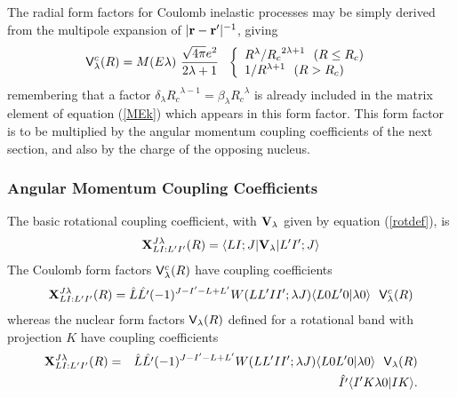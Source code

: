 \documentclass[11pt,a4paper]{article}
\newcommand{\vecr}{{\bf r}}
\newcommand{\Vee}{{\sf V}}
\begin{document}
The radial form factors for Coulomb inelastic processes may be simply
derived from the multipole expansion of
$| \vecr - \vecr' |^{-1}$, giving
\begin{eqnarray}
\Vee_\lambda^c (R) = M(E \lambda ) ~
             { \sqrt {4 \pi} e^2 \over 2 \lambda+1} ~~
          \left \{  \begin{array}{ll}
                {R^\lambda  /   {R_c}^{2 \lambda+1} ~~(R \leq R_c)}\\
                 {1  /   R^{\lambda+1} ~~ (R> R_c) }
                 \end{array} \right. ~
\end{eqnarray}
remembering that a factor $ \delta_\lambda {R_c}^{\lambda - 1} =
\beta_\lambda {R_c}^\lambda $ is already included in the matrix element
of equation (\ref{MEk}) which appears in this form factor.
This form factor is to be multiplied by the angular momentum coupling
coefficients of the next section, and also by the charge of the
opposing nucleus.
\subsubsection{Angular Momentum Coupling Coefficients}

\newcommand{\BX}{{\bf X}}
The basic rotational coupling coefficient, with $ {\bf V}_\lambda $
given by equation (\ref{rotdef}), is
\begin{eqnarray}
 \BX^{J \lambda}_{LI:L' I'} (R) =
     \langle LI; J | {\bf V}_\lambda | L' I' ; J\rangle
\end{eqnarray}
The Coulomb form factors $\Vee_\lambda^c (R)$ have
coupling coefficients
\begin{eqnarray}
  \BX^{J \lambda}_{LI:L' I'} (R) =
     \hat L \hat {L'} (-1)^{J-I' -L+L'}
     W(L L' I I' ; \lambda J)
    \langle L 0 L' 0 | \lambda 0\rangle
       ~~ \Vee_\lambda^c (R)
\end{eqnarray}
whereas the nuclear form factors $ \Vee_\lambda (R) $ defined for
a rotational band with projection $K$ have coupling coefficients
\begin{eqnarray}\nonumber
  \BX^{J \lambda}_{LI:L' I'} (R) &=&
 \hat L \hat {L'} (-1)^{J-I' -L+L'}
     W(L L'  I  I' ;  \lambda J)
    \langle L  0  L'  0 | \lambda 0\rangle
       ~~ \Vee_\lambda (R) \\
 &&\hat{I' } \langle I'  K  \lambda  0  |  I  K\rangle .
\end{eqnarray}
\end{document}
